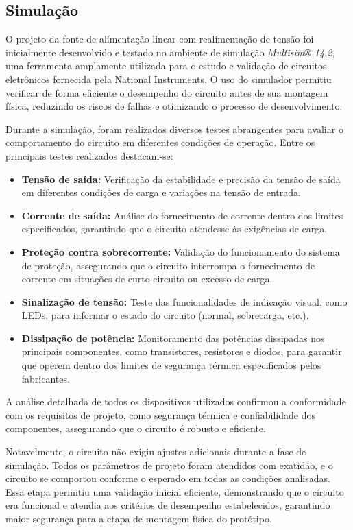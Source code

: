 \subsection{Simulação}

O projeto da fonte de alimentação linear com realimentação de tensão foi inicialmente desenvolvido e testado no ambiente de simulação \textit{Multisim® 14.2}, uma ferramenta amplamente utilizada para o estudo e validação de circuitos eletrônicos fornecida pela National Instruments. O uso do simulador permitiu verificar de forma eficiente o desempenho do circuito antes de sua montagem física, reduzindo os riscos de falhas e otimizando o processo de desenvolvimento.

Durante a simulação, foram realizados diversos testes abrangentes para avaliar o comportamento do circuito em diferentes condições de operação. Entre os principais testes realizados destacam-se:

\begin{itemize}
    \item \textbf{Tensão de saída:} Verificação da estabilidade e precisão da tensão de saída em diferentes condições de carga e variações na tensão de entrada.
    \item \textbf{Corrente de saída:} Análise do fornecimento de corrente dentro dos limites especificados, garantindo que o circuito atendesse às exigências de carga.
    \item \textbf{Proteção contra sobrecorrente:} Validação do funcionamento do sistema de proteção, assegurando que o circuito interrompa o fornecimento de corrente em situações de curto-circuito ou excesso de carga.
    \item \textbf{Sinalização de tensão:} Teste das funcionalidades de indicação visual, como LEDs, para informar o estado do circuito (normal, sobrecarga, etc.).
    \item \textbf{Dissipação de potência:} Monitoramento das potências dissipadas nos principais componentes, como transistores, resistores e diodos, para garantir que operem dentro dos limites de segurança térmica especificados pelos fabricantes.
\end{itemize}

A análise detalhada de todos os dispositivos utilizados confirmou a conformidade com os requisitos de projeto, como segurança térmica e confiabilidade dos componentes, assegurando que o circuito é robusto e eficiente.

Notavelmente, o circuito não exigiu ajustes adicionais durante a fase de simulação. Todos os parâmetros de projeto foram atendidos com exatidão, e o circuito se comportou conforme o esperado em todas as condições analisadas. Essa etapa permitiu uma validação inicial eficiente, demonstrando que o circuito era funcional e atendia aos critérios de desempenho estabelecidos, garantindo maior segurança para a etapa de montagem física do protótipo.

